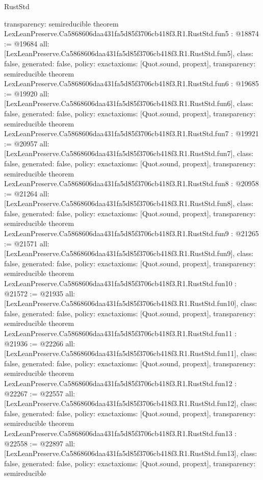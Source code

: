 \begin{lexlean}{RustStd}
\begin{coremodule}
{  transparency: semireducible
}
theorem LexLeanPreserve.Ca5868606daa431fa5d85f3706cb418f3.R1.RustStd.fun5 : @18874 := @19684 {
  all: [LexLeanPreserve.Ca5868606daa431fa5d85f3706cb418f3.R1.RustStd.fun5],
  class: false,
  generated: false,
  policy: exact{axioms: [Quot.sound, propext]},
  transparency: semireducible
}
theorem LexLeanPreserve.Ca5868606daa431fa5d85f3706cb418f3.R1.RustStd.fun6 : @19685 := @19920 {
  all: [LexLeanPreserve.Ca5868606daa431fa5d85f3706cb418f3.R1.RustStd.fun6],
  class: false,
  generated: false,
  policy: exact{axioms: [Quot.sound, propext]},
  transparency: semireducible
}
theorem LexLeanPreserve.Ca5868606daa431fa5d85f3706cb418f3.R1.RustStd.fun7 : @19921 := @20957 {
  all: [LexLeanPreserve.Ca5868606daa431fa5d85f3706cb418f3.R1.RustStd.fun7],
  class: false,
  generated: false,
  policy: exact{axioms: [Quot.sound, propext]},
  transparency: semireducible
}
theorem LexLeanPreserve.Ca5868606daa431fa5d85f3706cb418f3.R1.RustStd.fun8 : @20958 := @21264 {
  all: [LexLeanPreserve.Ca5868606daa431fa5d85f3706cb418f3.R1.RustStd.fun8],
  class: false,
  generated: false,
  policy: exact{axioms: [Quot.sound, propext]},
  transparency: semireducible
}
theorem LexLeanPreserve.Ca5868606daa431fa5d85f3706cb418f3.R1.RustStd.fun9 : @21265 := @21571 {
  all: [LexLeanPreserve.Ca5868606daa431fa5d85f3706cb418f3.R1.RustStd.fun9],
  class: false,
  generated: false,
  policy: exact{axioms: [Quot.sound, propext]},
  transparency: semireducible
}
theorem LexLeanPreserve.Ca5868606daa431fa5d85f3706cb418f3.R1.RustStd.fun10 : @21572 := @21935 {
  all: [LexLeanPreserve.Ca5868606daa431fa5d85f3706cb418f3.R1.RustStd.fun10],
  class: false,
  generated: false,
  policy: exact{axioms: [Quot.sound, propext]},
  transparency: semireducible
}
theorem LexLeanPreserve.Ca5868606daa431fa5d85f3706cb418f3.R1.RustStd.fun11 : @21936 := @22266 {
  all: [LexLeanPreserve.Ca5868606daa431fa5d85f3706cb418f3.R1.RustStd.fun11],
  class: false,
  generated: false,
  policy: exact{axioms: [Quot.sound, propext]},
  transparency: semireducible
}
theorem LexLeanPreserve.Ca5868606daa431fa5d85f3706cb418f3.R1.RustStd.fun12 : @22267 := @22557 {
  all: [LexLeanPreserve.Ca5868606daa431fa5d85f3706cb418f3.R1.RustStd.fun12],
  class: false,
  generated: false,
  policy: exact{axioms: [Quot.sound, propext]},
  transparency: semireducible
}
theorem LexLeanPreserve.Ca5868606daa431fa5d85f3706cb418f3.R1.RustStd.fun13 : @22558 := @22897 {
  all: [LexLeanPreserve.Ca5868606daa431fa5d85f3706cb418f3.R1.RustStd.fun13],
  class: false,
  generated: false,
  policy: exact{axioms: [Quot.sound, propext]},
  transparency: semireducible
}
\end{coremodule}
\end{lexlean}
